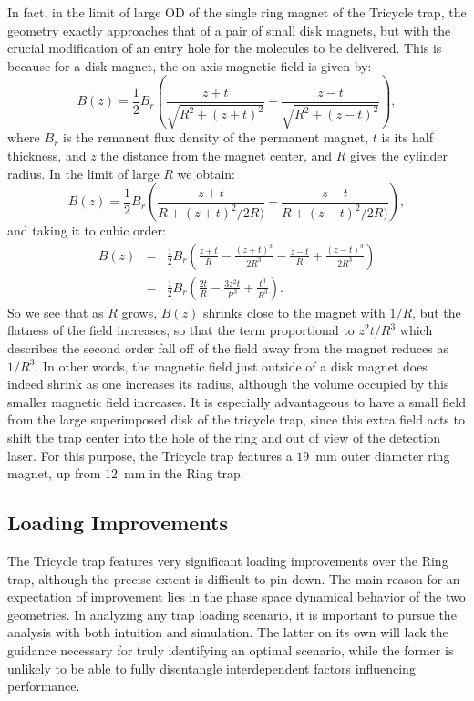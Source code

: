 In fact, in the limit of large OD of the single ring magnet of the Tricycle trap, the geometry exactly approaches that of a pair of small disk magnets, but with the crucial modification of an entry hole for the molecules to be delivered.
This is because for a disk magnet, the on-axis magnetic field is given by:
\begin{equation}
B(z) = \frac{1}{2}B_r\left(\frac{z+t}{\sqrt{R^2+(z+t)^2}} - \frac{z-t}{\sqrt{R^2+(z-t)^2}}    \right),
\end{equation}
where $B_r$ is the remanent flux density of the permanent magnet, $t$ is its half thickness, and $z$ the distance from the magnet center, and $R$ gives the cylinder radius. In the limit of large $R$ we obtain:
\begin{equation}
B(z) = \frac{1}{2}B_r\left( \frac{z+t}{R+(z+t)^2/2R)}  - \frac{z-t}{R+(z-t)^2/2R)}   \right),
\end{equation}
and taking it to cubic order:
\begin{eqnarray}
B(z) &=& \frac{1}{2}B_r\left( \frac{z+t}{R} - \frac{(z+t)^3}{2R^3}  - \frac{z-t}{R} + \frac{(z-t)^3}{2R^3}   \right)\\
&=& \frac{1}{2}B_r\left(\frac{2t}{R} - \frac{3z^2t}{R^3} + \frac{t^3}{R^3} \right).
\end{eqnarray} 
So we see that as $R$ grows, $B(z)$ shrinks close to the magnet with $1/R$, but the flatness of the field increases, so that the term proportional to $z^2t/R^3$ which describes the second order fall off of the field away from the magnet reduces as $1/R^3$.
In other words, the magnetic field just outside of a disk magnet does indeed shrink as one increases its radius, although the volume occupied by this smaller magnetic field increases.
It is especially advantageous to have a small field from the large superimposed disk of the tricycle trap, since this extra field acts to shift the trap center into the hole of the ring and out of view of the detection laser.
For this purpose, the Tricycle trap features a $19$~mm outer diameter ring magnet, up from $12$~mm in the Ring trap.

\subsection{Loading Improvements}

The Tricycle trap features very significant loading improvements over the Ring trap, although the precise extent is difficult to pin down. 
The main reason for an expectation of improvement lies in the phase space dynamical behavior of the two geometries.
In analyzing any trap loading scenario, it is important to pursue the analysis with both intuition and simulation.
The latter on its own will lack the guidance necessary for truly identifying an optimal scenario, while the former is unlikely to be able to fully disentangle interdependent factors influencing performance.

